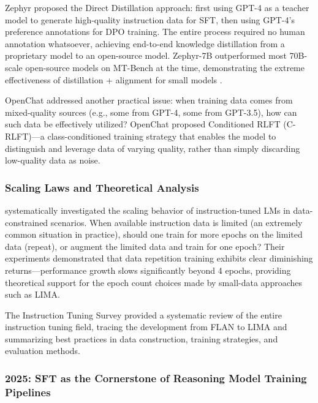 Zephyr \citep{tunstall2023zephyr} proposed the Direct Distillation approach:
first using GPT-4 as a teacher model to generate high-quality instruction data for SFT,
then using GPT-4's preference annotations for DPO training.
The entire process required no human annotation whatsoever, achieving end-to-end
knowledge distillation from a proprietary model to an open-source model.
Zephyr-7B outperformed most 70B-scale open-source models on MT-Bench at the time,
demonstrating the extreme effectiveness of distillation + alignment for small models
.

OpenChat \citep{wang2023openchat} addressed another practical issue:
when training data comes from mixed-quality sources (e.g., some from GPT-4, some from GPT-3.5),
how can such data be effectively utilized?
OpenChat proposed Conditioned RLFT (C-RLFT)---a
class-conditioned training strategy that enables the model to distinguish and leverage data of varying quality,
rather than simply discarding low-quality data as noise.


\subsubsection{Scaling Laws and Theoretical Analysis}
\label{sec:t1-scaling}

\citet{muennighoff2023scaling} systematically investigated
the scaling behavior of instruction-tuned LMs in data-constrained scenarios.
When available instruction data is limited (an extremely common situation in practice),
should one train for more epochs on the limited data (repeat), or augment the limited data and train for one epoch?
Their experiments demonstrated that data repetition training exhibits clear diminishing returns---performance
growth slows significantly beyond 4 epochs,
providing theoretical support for the epoch count choices made by small-data approaches such as LIMA.

The Instruction Tuning Survey \citep{zhang2023instruction} provided
a systematic review of the entire instruction tuning field, tracing the development from FLAN to LIMA
and summarizing best practices in data construction, training strategies, and evaluation methods.


\subsubsection{2025: SFT as the Cornerstone of Reasoning Model Training Pipelines}
\label{sec:t1-2025}

